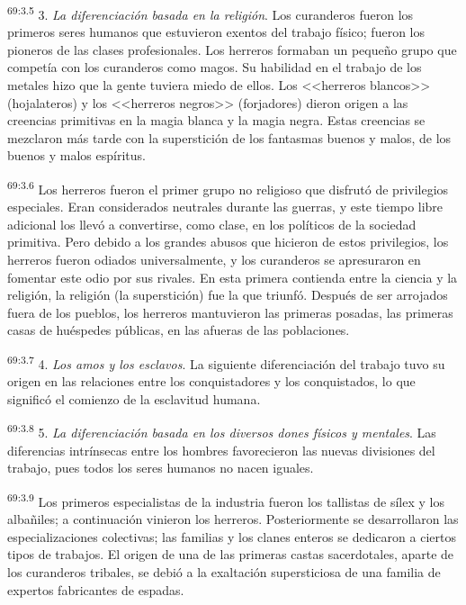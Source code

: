 \par
\textsuperscript{69:3.5} 3. \textit{La diferenciación basada en la religión}. Los curanderos fueron los primeros seres humanos que estuvieron exentos del trabajo físico; fueron los pioneros de las clases profesionales. Los herreros formaban un pequeño grupo que competía con los curanderos como magos. Su habilidad en el trabajo de los metales hizo que la gente tuviera miedo de ellos. Los <<herreros blancos>> (hojalateros) y los <<herreros negros>> (forjadores) dieron origen a las creencias primitivas en la magia blanca y la magia negra. Estas creencias se mezclaron más tarde con la superstición de los fantasmas buenos y malos, de los buenos y malos espíritus.

\par
\textsuperscript{69:3.6} Los herreros fueron el primer grupo no religioso que disfrutó de privilegios especiales. Eran considerados neutrales durante las guerras, y este tiempo libre adicional los llevó a convertirse, como clase, en los políticos de la sociedad primitiva. Pero debido a los grandes abusos que hicieron de estos privilegios, los herreros fueron odiados universalmente, y los curanderos se apresuraron en fomentar este odio por sus rivales. En esta primera contienda entre la ciencia y la religión, la religión (la superstición) fue la que triunfó. Después de ser arrojados fuera de los pueblos, los herreros mantuvieron las primeras posadas, las primeras casas de huéspedes públicas, en las afueras de las poblaciones.

\par
\textsuperscript{69:3.7} 4. \textit{Los amos y los esclavos}. La siguiente diferenciación del trabajo tuvo su origen en las relaciones entre los conquistadores y los conquistados, lo que significó el comienzo de la esclavitud humana.

\par
\textsuperscript{69:3.8} 5. \textit{La diferenciación basada en los diversos dones físicos y mentales}. Las diferencias intrínsecas entre los hombres favorecieron las nuevas divisiones del trabajo, pues todos los seres humanos no nacen iguales.

\par
\textsuperscript{69:3.9} Los primeros especialistas de la industria fueron los tallistas de sílex y los albañiles; a continuación vinieron los herreros. Posteriormente se desarrollaron las especializaciones colectivas; las familias y los clanes enteros se dedicaron a ciertos tipos de trabajos. El origen de una de las primeras castas sacerdotales, aparte de los curanderos tribales, se debió a la exaltación supersticiosa de una familia de expertos fabricantes de espadas.

